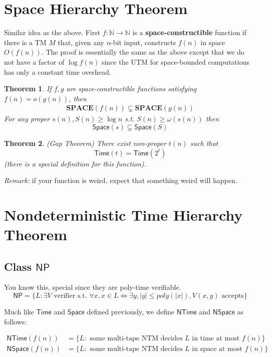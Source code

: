 \documentclass[twoside]{article}
\newcounter{lecnum}
\newtheorem{theorem}{Theorem}[lecnum]
\def\N{\mathbb{N}}
\def\Time{\mathsf{Time}}
\def\Space{\mathsf{Space}}
\def\NTime{\mathsf{NTime}}
\def\NSpace{\mathsf{NSpace}}
\begin{document}
\section{Space Hierarchy Theorem}
Similar idea as the above. First $f: \N \rightarrow \N$ is a \textbf{space-constructible} function if there is a TM $M$ that, given any $n$-bit input, constructs $f(n)$ in space $O(f(n))$. The proof is essentially the same as the above except that we do not have a factor of $\log f(n)$ since the UTM for space-bounded computations has only a constant time overhead. 
\begin{theorem}
If $f, g$ are space-constructible functions satisfying $f(n) = o(g(n))$, then 
\begin{align}
\mathbf{SPACE}(f(n)) \subsetneq \mathbf{SPACE}(g(n)) \label{DistinguishSpace}
\end{align}
For any proper $s(n), S(n) \geq \log n$ s.t. $S(n) \geq \omega(s(n))$ then 
\[\mathsf{Space}(s) \subsetneq \mathsf{Space}(S)\]
\end{theorem}

\begin{theorem}
(Gap Theorem) There exist non-proper $t(n)$ such that 
\[\mathsf{Time}(t) = \mathsf{Time}(2^t)\]
(there is a special definition for this function). 
\end{theorem}
\emph{Remark:} if your function is weird, expect that something weird will happen. 

\section{Nondeterministic Time Hierarchy Theorem}

\subsection{Class $\mathsf{NP}$}
You know this, special since they are poly-time verifiable. 
\[\mathsf{NP} = \{L: \exists V \mbox{ verifier s.t. } \forall x, x \in L \iff \exists y, |y| \leq poly(|x|), V(x,y) \mbox{ accepts}\}\]

Much like $\Time$ and $\Space$ defined previously, we define $\NTime$ and $\NSpace$ as follows:

\begin{align*}
\NTime (f(n)) &= \{L: \mbox{ some multi-tape NTM decides } L \mbox{ in time at most }f(n)\} \\
\NSpace(f(n)) &= \{L: \mbox{ some multi-tape NTM decides } L \mbox{ in space at most }f(n)\}
\end{align*}
\end{document}

